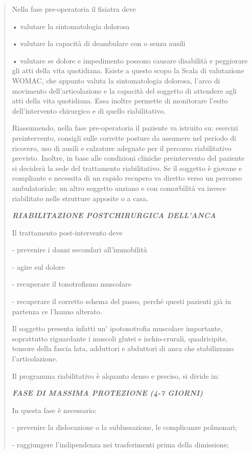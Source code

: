 \documentclass[]{article}
\begin{document}
\begin{quote}
Nella fase pre-operatoria il fisiatra deve

• valutare la sintomatologia dolorosa

• valutare la capacità di deambulare con o senza ausili

• valutare se dolore e impedimento possono causare disabilità e
peggiorare gli atti della vita quotidiana. Esiste a questo scopo la
Scala di valutazione WOMAC, che appunto valuta la sintomatologia
dolorosa, l'arco di movimento dell'articolazione e la capacità del
soggetto di attendere agli atti della vita quotidiana. Essa inoltre
permette di monitorare l'esito dell'intervento chirurgico e di quello
riabilitativo.

Riassumendo, nella fase pre-operatoria il paziente va istruito su:
esercizi preintervento, consigli sulle corrette posture da assumere nel
periodo di ricovero, uso di ausili e calzature adeguate per il percorso
riabilitativo previsto. Inoltre, in base alle condizioni cliniche
preintervento del paziente si deciderà la sede del trattamento
riabilitativo. Se il soggetto è giovane e compliante e necessita di un
rapido recupero va diretto verso un percorso ambulatoriale; un altro
soggetto anziano e con comorbilità va invece riabilitato nelle strutture
apposite o a casa.

\textbf{\emph{RIABILITAZIONE POSTCHIRURGICA DELL'ANCA }}

Il trattamento post-intervento deve

- prevenire i danni secondari all'immobilità

- agire sul dolore

- recuperare il tonotrofismo muscolare

- recuperare il corretto schema del passo, perché questi pazienti già in
partenza ce l'hanno alterato.

Il soggetto presenta infatti un' ipotonotrofia muscolare importante,
soprattutto riguardante i muscoli glutei e ischio-crurali, quadricipite,
tensore della fascia lata, adduttori e abduttori di anca che
stabilizzano l'articolazione.

Il programma riabilitativo è alquanto denso e preciso, si divide in:

\textbf{\emph{FASE DI MASSIMA PROTEZIONE (4-7 GIORNI)}}

In questa fase è necessario:

- prevenire la dislocazione o la sublussazione, le complicanze
polmonari;

- raggiungere l'indipendenza nei trasferimenti prima della dimissione;


\end{quote}
\end{document}
